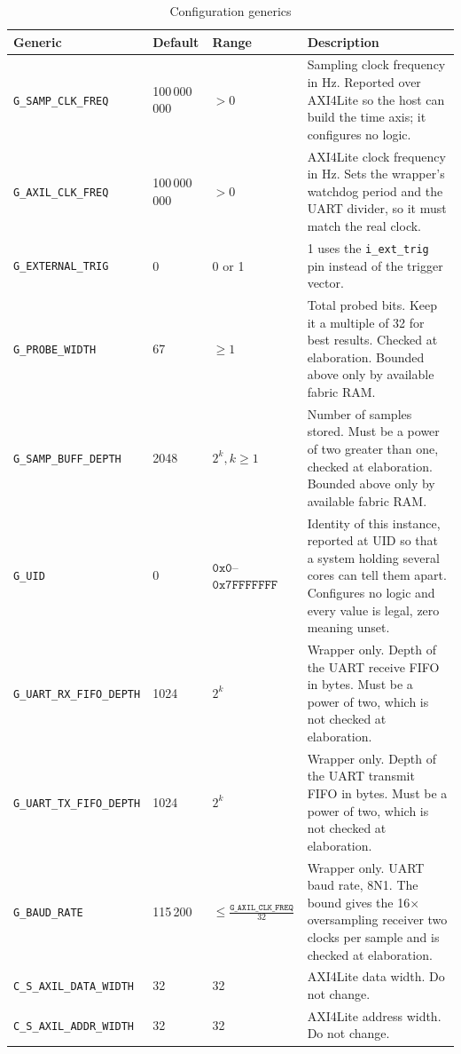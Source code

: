 \documentclass[twocolumn]{article}
\newcommand{\hex}[1]{\ensuremath{\mathtt{0x#1}}}
\begin{document}
\begin{table}[H]
    \centering
    \begin{tabularx}{\textwidth}{|l|l|l|P|}
        \hline
         \textbf{Generic} & \textbf{Default} & \textbf{Range} & \textbf{Description} \\
        \hline
        \texttt{G\_SAMP\_CLK\_FREQ} & 100\,000\,000 & $> 0$ & Sampling clock frequency in Hz. Reported over AXI4Lite so the host can build the time axis; it configures no logic. \\
        \hline
        \texttt{G\_AXIL\_CLK\_FREQ} & 100\,000\,000 & $> 0$ & AXI4Lite clock frequency in Hz. Sets the wrapper's watchdog period and the \acs{UART} divider, so it must match the real clock. \\
        \hline
        \texttt{G\_EXTERNAL\_TRIG} & 0 & 0 or 1 & 1 uses the \texttt{i\_ext\_trig} pin instead of the trigger vector. \\
        \hline
        \texttt{G\_PROBE\_WIDTH} & 67 & $\geq 1$ & Total probed bits. Keep it a multiple of 32 for best results. Checked at elaboration. Bounded above only by available fabric RAM. \\
        \hline
        \texttt{G\_SAMP\_BUFF\_DEPTH} & 2048 & $2^k, k \geq 1$ & Number of samples stored. Must be a power of two greater than one, checked at elaboration. Bounded above only by available fabric RAM. \\
        \hline
        \texttt{G\_UID} & 0 & \hex{0}--\hex{7FFFFFFF} & Identity of this instance, reported at UID so that a system holding several cores can tell them apart. Configures no logic and every value is legal, zero meaning unset. \\
        \hline
        \texttt{G\_UART\_RX\_FIFO\_DEPTH} & 1024 & $2^k$ & Wrapper only. Depth of the \acs{UART} receive \ac{FIFO} in bytes. Must be a power of two, which is not checked at elaboration. \\
        \hline
        \texttt{G\_UART\_TX\_FIFO\_DEPTH} & 1024 & $2^k$ & Wrapper only. Depth of the \acs{UART} transmit \ac{FIFO} in bytes. Must be a power of two, which is not checked at elaboration. \\
        \hline
        \texttt{G\_BAUD\_RATE} & 115\,200 & $\leq \frac{\texttt{G\_AXIL\_CLK\_FREQ}}{32}$ & Wrapper only. \acs{UART} baud rate, 8N1. The bound gives the 16$\times$ oversampling receiver two clocks per sample and is checked at elaboration. \\
        \hline
        \texttt{C\_S\_AXIL\_DATA\_WIDTH} & 32 & 32 & AXI4Lite data width. Do not change. \\
        \hline
        \texttt{C\_S\_AXIL\_ADDR\_WIDTH} & 32 & 32 & AXI4Lite address width. Do not change. \\
        \hline
    \end{tabularx}
    \caption{Configuration generics}
    \label{tab:generics}
\end{table}
\end{document}
